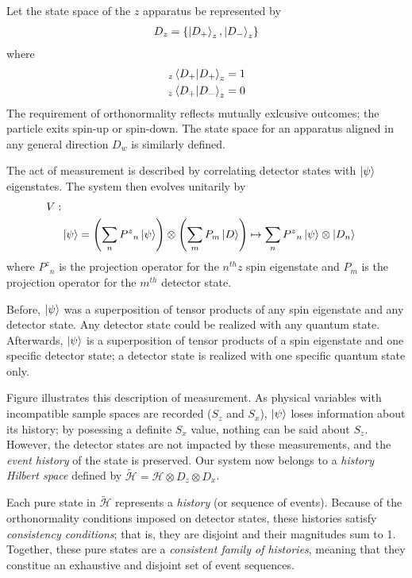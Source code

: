 Let the state space of the $z$ apparatus be represented by
\begin{align*}
    {D}_z =  \{\ket{D_+}_z, \ket{D_-}_z\}
\end{align*}
where
\begin{align*}
    _z\braket{D_+|D_+}_z&=1 \\
    _z\braket{D_+|D_-}_z&=0
\end{align*}
The requirement of orthonormality reflects mutually exlcusive outcomes; the particle exits spin-up or spin-down. The state space for an apparatus aligned in any general direction ${D}_w$ is similarly defined.

The act of measurement is described by correlating detector states with $\ket{\psi}$ eigenstates. The system then evolves unitarily by
\begin{align}
    \nonumber V: \\
    & \ket{\psi} = \left(\sum_{n} {P^z}_n\ket{\psi}\right) \otimes \left(\sum_{m} P_m\ket{D}\right) \mapsto \sum_{n} {P^z}_n\ket{\psi} \otimes \ket{D_n}
\end{align}
where ${P^z}_n$ is the projection operator for the $n^{th} z$ spin eigenstate and $P_m$ is the projection operator for the $m^{th}$ detector state.

Before, $\ket{\psi}$ was a superposition of tensor products of any spin eigenstate and any detector state. Any detector state could be realized with any quantum state. Afterwards, $\ket{\psi}$ is a superposition of tensor products of a spin eigenstate and one specific detector state; a detector state is realized with one specific quantum state only.

Figure  illustrates this description of measurement. As physical variables with incompatible sample spaces are recorded ($S_z$ and $S_x$), $\ket{\psi}$ loses information about its history; by posessing a definite $S_x$ value, nothing can be said about $S_z$. However, the detector states are not impacted by these measurements, and the \textit{event history} of the state is preserved. Our system now belongs to a \textit{history Hilbert space} defined by $\widetilde{\mathcal{H}} = \mathcal{H} \otimes D_z \otimes D_x$.

Each pure state in $\widetilde{\mathcal{H}}$ represents a \textit{history} (or sequence of events). Because of the orthonormality conditions imposed on detector states, these histories satisfy \textit{consistency conditions}; that is, they are disjoint and their magnitudes sum to 1. Together, these pure states are a \textit{consistent family of histories}, meaning that they constitue an exhaustive and disjoint set of event sequences.

